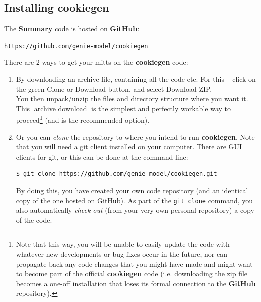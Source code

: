 
\subsection{Installing cookiegen}

The \textbf{Summary} code is hosted on \textbf{GitHub}:

\vspace{2mm}
\href{https://github.com/genie-model/cookiegen}{\texttt{https://github.com/genie-model/cookiegen}}
\vspace{2mm}

There are 2 ways to get your mitts on the \textbf{cookiegen} code:

\vspace{2mm}
\begin{enumerate}

\vspace{1mm}
\item By downloading an archive file, containing all the code etc. For this -- click on the \textcolor[rgb]{0,0.501961,0}{green} \textsf{\footnotesize Clone or Download} button, and select \textsf{\footnotesize Download ZIP}.
\\You then unpack/unzip the files and directory structure where you want it.
\\This [archive download] is the simplest and  perfectly workable way to proceed\footnote{Note that this way, you will be unable to easily update the code with whatever new developments or bug fixes occur in the future, nor can propagate back any code changes that you might have made and might want to become part of the official \textbf{cookiegen} code  (i.e. downloading the \textsf{zip} file becomes a one-off installation that loses its formal connection to the \textbf{GitHub} repository).} (and is the recommended option).

\vspace{1mm}
\item Or you can \textit{clone} the repository to where you intend to run \textbf{cookiegen}. Note that you will need a git client installed on your computer. There are GUI clients for git, or this can be done at the command line:

\vspace{-2mm}\small\begin{verbatim}
$ git clone https://github.com/genie-model/cookiegen.git
\end{verbatim}\normalsize\vspace{-2mm}

By doing this, you have created your own code repository (and an identical copy of the one hosted on GitHub). As part of the \texttt{git clone} command, you also automatically \textit{check out} (from your very own personal repository) a copy of the code.

\end{enumerate}
\vspace{2mm}

